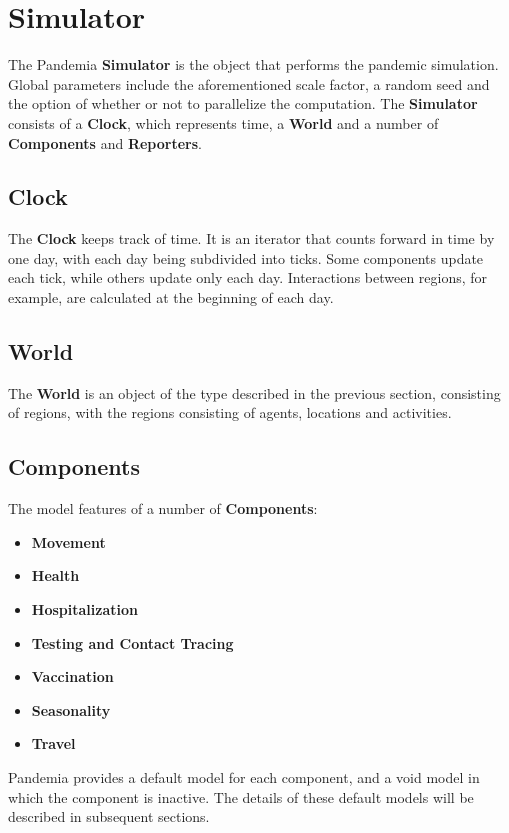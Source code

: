 \documentclass[10pt,letterpaper]{article}
\begin{document}
\section{Simulator}

The Pandemia \textbf{Simulator} is the object that performs the pandemic simulation. Global parameters include the aforementioned scale factor, a random seed and the option of whether or not to parallelize the computation. The \textbf{Simulator} consists of a \textbf{Clock}, which represents time, a \textbf{World} and a number of \textbf{Components} and \textbf{Reporters}.

\subsection{Clock}

The \textbf{Clock} keeps track of time. It is an iterator that counts forward in time by one day, with each day being subdivided into ticks. Some components update each tick, while others update only each day. Interactions between regions, for example, are calculated at the beginning of each day.

\subsection{World}

The \textbf{World} is an object of the type described in the previous section, consisting of regions, with the regions consisting of agents, locations and activities.

\subsection{Components}

The model features of a number of \textbf{Components}:
\begin{itemize}
\item \textbf{Movement}
\item \textbf{Health}
\item \textbf{Hospitalization}
\item \textbf{Testing and Contact Tracing}
\item \textbf{Vaccination}
\item \textbf{Seasonality}
\item \textbf{Travel}
\end{itemize}
Pandemia provides a default model for each component, and a void model in which the component is inactive. The details of these default models will be described in subsequent sections.
\end{document}
